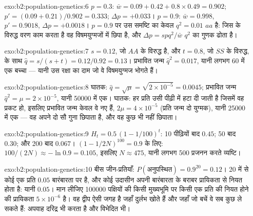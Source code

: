 \begin{solution}{exo:b2:population-genetics:6}
$p = 0.3$: $\bar w = 0.09 + 0.42 + 0.8\times 0.49 = 0.902$; $p' =
(0.09 + 0.21)/0.902 = 0.333$; $\Delta p = +0.033$। $p = 0.9$: $\bar w
= 0.998$, $p' = 0.9018$, $\Delta p = +0.0018$। $p = 0.9$ पर उस समष्टि का केवल
$q^{2} = 0.01$ $aa$ है: जिस  के विरुद्ध वरण काम करता है
वह विषमयुग्मजों में छिपा है, और $\Delta p = spq^{2}/\bar w$
$q^{2}$ का गुणक ढोता है।
\end{solution}

\begin{solution}{exo:b2:population-genetics:7}
$s = 0.12$, जो $AA$ के विरुद्ध है, और $t = 0.8$, जो $SS$ के विरुद्ध, के साथ $\hat q =
s/(s + t) = 0.12/0.92 = 0.13$। प्रभावित जन्म $\hat q^{2} = 0.017$,
यानी लगभग 60 में एक बच्चा --- यानी उस रक्षा का दाम जो वे
विषमयुग्मज भोगते हैं।
\end{solution}

\begin{solution}{exo:b2:population-genetics:8}
 घातक: $\hat q = \sqrt{\mu} = \sqrt{2\times 10^{-5}} =
0.0045$; प्रभावित जन्म $\hat q^{2} = \mu = 2\times 10^{-5}$, यानी
\num{50000} में एक।  घातक: हर प्रति उसी पीढ़ी में हटा दी जाती है
जिसमें वह प्रकट हो, इसलिए प्रभावित जन्म केवल वे नए
 हैं, $2\mu = 4\times 10^{-5}$ (प्रति जन्म दो युग्मक), यानी
\num{25000} में एक --- वह  अपने  दो सौ गुना छिपाता है,
और वह  कुछ भी नहीं छिपाता।
\end{solution}

\begin{solution}{exo:b2:population-genetics:9}
$H_t = 0.5\,(1 - 1/100)^{t}$: 10 पीढ़ियों बाद $0.45$; 50 बाद
$0.30$; और 200 बाद $0.067$। $(1 - 1/2N)^{100} = 0.9$ के लिए:
$100/(2N) \approx -\ln 0.9 = 0.105$, इसलिए $N \approx 475$, यानी लगभग 500
प्रजनन करते व्यष्टि।
\end{solution}

\begin{solution}{exo:b2:population-genetics:10}
बीस जीन-प्रतियाँ: $P(\text{अनुपस्थित}) = 0.9^{20} = 0.12$। 20 में से कोई एक
प्रति $0.05$ बारंबारता पर है, और कोई उदासीन  अपनी बारंबारता के बराबर
प्रायिकता से नियत होता है: यानी $0.05$। मान लीजिए
\num{100000} पक्षियों की किसी मुख्यभूमि पर किसी एक प्रति की नियत होने की प्रायिकता $5\times 10^{-6}$
है। वह द्वीप ऐसी जगह है जहाँ दुर्लभ  खोते हैं और
जहाँ जो बचें वे सब कुछ ले सकते हैं: अपवाह दरिद्र भी करता है और
विभेदित भी।
\end{solution}

